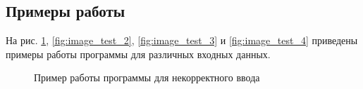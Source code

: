 \documentclass[a4paper,14pt]{article}
\begin{document}
    
    \subsection{Примеры работы}
        
        На рис. \ref{fig:image_test_1}, \ref{fig:image_test_2}, \ref{fig:image_test_3} и \ref{fig:image_test_4} приведены примеры работы программы для различных входных данных. 
        
        	\begin{figure}[h!]
                \caption{Пример работы программы для некорректного ввода}
                \label{fig:image_test_1}
            \end{figure}
            
\end{document}
